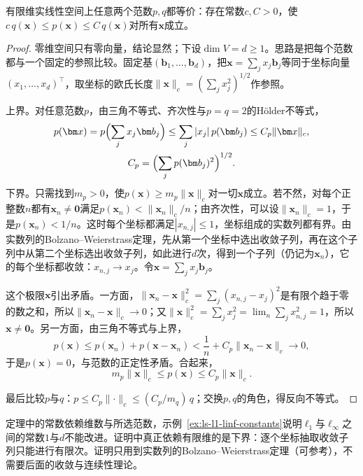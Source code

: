 \begin{theorem}[有限维范数等价]
\label{thm:ls-norm-equivalence}
有限维实线性空间上任意两个范数$p,q$都等价：存在常数$c,C>0$，使$c\,q(\bm x)\leq p(\bm x)\leq C\,q(\bm x)$对所有$\bm x$成立。
\end{theorem}
\begin{proof}
零维空间只有零向量，结论显然；下设$\dim V=d\geq1$。思路是把每个范数都与一个固定的参照比较。固定基$(\bm b_1,\ldots,\bm b_d)$，把$\bm x=\sum_jx_j\bm b_j$等同于坐标向量$(x_1,\ldots,x_d)^\top$，取坐标的欧氏长度$\lVert\bm x\rVert_c=(\sum_jx_j^2)^{1/2}$作参照。

上界。对任意范数$p$，由三角不等式、齐次性与$p=q=2$的Hölder不等式，
\[
 \begin{gathered}
 p(\bm x)=p\Bigl(\sum_jx_j\bm b_j\Bigr)\leq\sum_j|x_j|\,p(\bm b_j)\leq C_p\lVert\bm x\rVert_c,\\
 C_p=\Bigl(\sum_jp(\bm b_j)^2\Bigr)^{1/2}.
 \end{gathered}
\]
下界。只需找到$m_p>0$，使$p(\bm x)\geq m_p\lVert\bm x\rVert_c$对一切$\bm x$成立。若不然，对每个正整数$n$都有$\bm x_n\neq\bm0$满足$p(\bm x_n)<\lVert\bm x_n\rVert_c/n$；由齐次性，可以设$\lVert\bm x_n\rVert_c=1$，于是$p(\bm x_n)<1/n$。这时每个坐标都满足$|x_{n,j}|\leq1$，坐标组成的实数列都有界。由实数列的Bolzano--Weierstrass定理，先从第一个坐标中选出收敛子列，再在这个子列中从第二个坐标选出收敛子列，如此进行$d$次，得到一个子列（仍记为$\bm x_n$），它的每个坐标都收敛：$x_{n,j}\to x_j$。令$\bm x=\sum_jx_j\bm b_j$。

这个极限$\bm x$引出矛盾。一方面，$\lVert\bm x_n-\bm x\rVert_c^2=\sum_j(x_{n,j}-x_j)^2$是有限个趋于零的数之和，所以$\lVert\bm x_n-\bm x\rVert_c\to0$；又$\lVert\bm x\rVert_c^2=\sum_jx_j^2=\lim_n\sum_jx_{n,j}^2=1$，所以$\bm x\neq\bm0$。另一方面，由三角不等式与上界，
\[
 p(\bm x)\leq p(\bm x_n)+p(\bm x-\bm x_n)<\frac1n+C_p\lVert\bm x_n-\bm x\rVert_c\to0,
\]
于是$p(\bm x)=0$，与范数的正定性矛盾。合起来，
\begin{equation}
 m_p\lVert\bm x\rVert_c\leq p(\bm x)\leq C_p\lVert\bm x\rVert_c.
 \label{eq:linear-algebra-finite-norm-equivalence}
\end{equation}

最后比较$p$与$q$：$p\leq C_p\lVert\cdot\rVert_c\leq(C_p/m_q)\,q$；交换$p,q$的角色，得反向不等式。
\end{proof}
定理中的常数依赖维数与所选范数，示例~\ref{ex:ls-l1-linf-constants}说明$\ell_1$与$\ell_\infty$之间的常数$1$与$d$不能改进。证明中真正依赖有限维的是下界：逐个坐标抽取收敛子列只能进行有限次。证明只用到实数列的Bolzano--Weierstrass定理（可参考），不需要后面的收敛与连续性理论。

